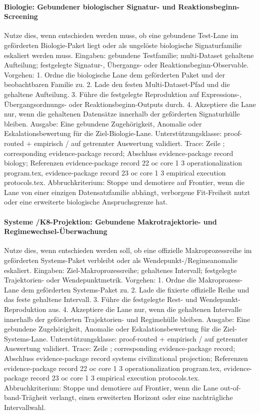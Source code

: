 \paragraph{Biologie: Gebundener biologischer Signatur- und Reaktionsbeginn-Screening}
Nutze dies, wenn entschieden werden muss, ob eine gebundene Test-Lane im geförderten Biologie-Paket liegt oder als ungelöste biologische Signaturfamilie eskaliert werden muss.
Eingaben: gebundene Testfamilie; \allowbreak multi-Dataset gehaltene Aufteilung; \allowbreak festgelegte Signatur-, Übergangs- oder Reaktionsbeginn-Observable.
Vorgehen: 1. Ordne die biologische Lane dem geförderten Paket und der beobachtbaren Familie zu. 2. Lade den festen Multi-Dataset-Pfad und die gehaltene Aufteilung. 3. Führe die festgelegte Reproduktion auf Expressions-, Übergangsordnungs- oder Reaktionsbeginn-Outputs durch. 4. Akzeptiere die Lane nur, wenn die gehaltenen Datensätze innerhalb der geförderten Signaturhülle bleiben.
Ausgabe: Eine gebundene Zugehörigkeit, Anomalie oder Eskalationsbewertung für die Ziel-Biologie-Lane.
Unterstützungsklasse: proof-routed + empirisch / auf getrennter Auswertung validiert.
Trace: Zeile ; corresponding evidence-package record; \allowbreak Abschluss evidence-package record biology; \allowbreak Referenzen evidence-package record 22 oc core 1 3 operationalization program.tex, \allowbreak evidence-package record 23 oc core 1 3 empirical execution protocols.tex.
Abbruchkriterium: Stoppe und demotiere auf Frontier, wenn die Lane von einer einzigen Datensatzfamilie abhängt, verborgene Fit-Freiheit nutzt oder eine erweiterte biologische Anspruchsgrenze hat.

\paragraph{Systeme /\allowbreak K8-Projektion: Gebundene Makrotrajektorie- und Regimewechsel-Überwachung}
Nutze dies, wenn entschieden werden soll, ob eine offizielle Makroprozessreihe im geförderten Systems-Paket verbleibt oder als Wendepunkt-/Regimeanomalie eskaliert.
Eingaben: Ziel-Makroprozessreihe; \allowbreak gehaltenes Intervall; \allowbreak festgelegte Trajektorien- oder Wendepunktmetrik.
Vorgehen: 1. Ordne die Makroprozess-Lane dem geförderten Systems-Paket zu. 2. Lade die fixierte offizielle Reihe und das feste gehaltene Intervall. 3. Führe die festgelegte Rest- und Wendepunkt-Reproduktion aus. 4. Akzeptiere die Lane nur, wenn die gehaltenen Intervalle innerhalb der geförderten Trajektorien- und Regimehülle bleiben.
Ausgabe: Eine gebundene Zugehörigkeit, Anomalie oder Eskalationsbewertung für die Ziel-Systems-Lane.
Unterstützungsklasse: proof-routed + empirisch / auf getrennter Auswertung validiert.
Trace: Zeile ; corresponding evidence-package record; \allowbreak Abschluss evidence-package record systems civilizational projection; \allowbreak Referenzen evidence-package record 22 oc core 1 3 operationalization program.tex, \allowbreak evidence-package record 23 oc core 1 3 empirical execution protocols.tex.
Abbruchkriterium: Stoppe und demotiere auf Frontier, wenn die Lane out-of-band-Trägheit verlangt, einen erweiterten Horizont oder eine nachträgliche Intervallwahl.

